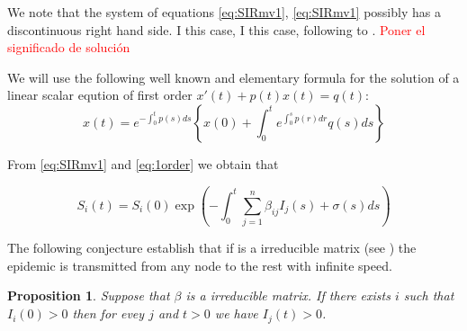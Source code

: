 \documentclass[a4paper,10pt]{article}
\newtheorem{prop}[thm]{Proposition}
\theoremstyle{remark}
\begin{document}
  
We  note that the system of equations \eqref{eq:SIRmv1}, \eqref{eq:SIRmv1} possibly has a discontinuous right hand side. I this case,  I this case, following to \cite{A.F.Filippov512}. \textcolor{red}{Poner el significado de solución}
  



We will use the following well known and elementary formula for the solution of a linear scalar eqution of first order $x'(t)+p(t)x(t)=q(t)$:
\begin{equation}\label{eq:1order}
 x(t)=e^{-\int_0^tp(s)ds}\left\{x(0)+\int_0^t e^{\int_0^sp(r)dr}q(s) ds \right\}
\end{equation}

From  \eqref{eq:SIRmv1} and \eqref{eq:1order} we obtain that

\[
 S_i(t)=S_i(0)
 \exp\left(
    -\int_0^t\sum\limits_{j=1}^{n} \beta_{i j} I_{j}(s)+\sigma(s)ds
    \right)
\]




The following conjecture establish that if is a irreducible matrix (see \cite{CarlD.Meyer538}) the epidemic is transmitted from any node to the rest with infinite speed.


\begin{prop} Suppose that $\beta$ is a irreducible matrix. If there exists $i$ such that $I_i(0)>0$ then for evey $j$ and $t>0$ we have $I_j(t)>0$.
\end{prop}
 
\end{document}
